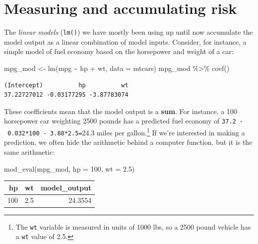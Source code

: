 \documentclass[
  letterpaper,
  DIV=11,
  numbers=noendperiod,
  oneside]{scrreprt}
\newenvironment{Shaded}{\begin{snugshade}}{\end{snugshade}}
\newcommand{\AttributeTok}[1]{\textcolor[rgb]{0.40,0.45,0.13}{#1}}
\newcommand{\DecValTok}[1]{\textcolor[rgb]{0.68,0.00,0.00}{#1}}
\newcommand{\FloatTok}[1]{\textcolor[rgb]{0.68,0.00,0.00}{#1}}
\newcommand{\FunctionTok}[1]{\textcolor[rgb]{0.28,0.35,0.67}{#1}}
\newcommand{\NormalTok}[1]{\textcolor[rgb]{0.00,0.23,0.31}{#1}}
\newcommand{\OtherTok}[1]{\textcolor[rgb]{0.00,0.23,0.31}{#1}}
\newcommand{\SpecialCharTok}[1]{\textcolor[rgb]{0.37,0.37,0.37}{#1}}
\begin{document}
{\begin{footnotesize}
\hypertarget{sec-lesson-33}{%
\chapter{Measuring and accumulating risk}\label{sec-lesson-33}}

The \emph{linear models} (\texttt{lm()}) we have mostly been using up
until now accumulate the model output as a linear combination of model
inputs. Consider, for instance, a simple model of fuel economy based on
the horsepower and weight of a car:

\begin{Shaded}
\begin{Highlighting}[]
\NormalTok{mpg\_mod }\OtherTok{\textless{}{-}} \FunctionTok{lm}\NormalTok{(mpg }\SpecialCharTok{\textasciitilde{}}\NormalTok{ hp }\SpecialCharTok{+}\NormalTok{ wt, }\AttributeTok{data =}\NormalTok{ mtcars) }
\NormalTok{mpg\_mod }\SpecialCharTok{\%\textgreater{}\%} \FunctionTok{coef}\NormalTok{()}
\end{Highlighting}
\end{Shaded}

\begin{verbatim}
(Intercept)          hp          wt 
37.22727012 -0.03177295 -3.87783074 
\end{verbatim}

These coefficients mean that the model output is a \textbf{sum}. For
instance, a 100 horsepower car weighting 2500 pounds has a predicted
fuel economy of \texttt{37.2\ -\ 0.032*100\ -\ 3.88*2.5=}24.3 miles per
gallon.\footnote{The \texttt{wt} variable is measured in units of 1000
  lbs, so a 2500 pound vehicle has a \texttt{wt} value of 2.5.} If we're
interested in making a prediction, we often hide the arithmetic behind a
computer function, but it is the same arithmetic:

\begin{Shaded}
\begin{Highlighting}[]
\FunctionTok{mod\_eval}\NormalTok{(mpg\_mod, }\AttributeTok{hp =} \DecValTok{100}\NormalTok{, }\AttributeTok{wt =} \FloatTok{2.5}\NormalTok{)}
\end{Highlighting}
\end{Shaded}

\ttfamily 
\begin{tabular}{rrr}
\toprule
hp & wt & model\_output\\
\midrule
100 & 2.5 & 24.3554\\
\bottomrule
\end{tabular} \normalfont
\bigskip


\end{footnotesize}}
\end{document}
